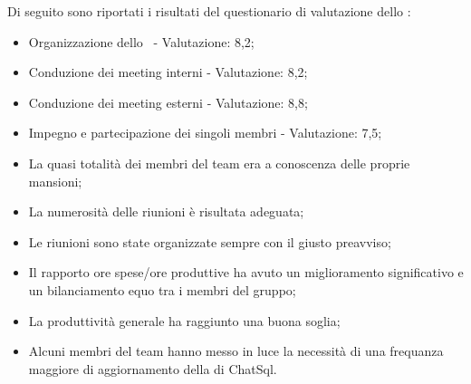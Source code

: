 \par Di seguito sono riportati i risultati del questionario di valutazione dello :
\begin{itemize}
  \item Organizzazione dello \ - Valutazione: 8,2;
  \item Conduzione dei meeting interni - Valutazione: 8,2;
  \item Conduzione dei meeting esterni - Valutazione: 8,8;
  \item Impegno e partecipazione dei singoli membri - Valutazione: 7,5;
  \item La quasi totalità dei membri del team era a conoscenza delle proprie mansioni;
  \item La numerosità delle riunioni è risultata adeguata;
  \item Le riunioni sono state organizzate sempre con il giusto preavviso;
  \item Il rapporto ore spese/ore produttive ha avuto un miglioramento significativo e un bilanciamento equo tra i membri del gruppo;
  \item La produttività generale ha raggiunto una buona soglia;
  \item Alcuni membri del team hanno messo in luce la necessità di una frequanza maggiore di aggiornamento della  di ChatSql.
\end{itemize}

